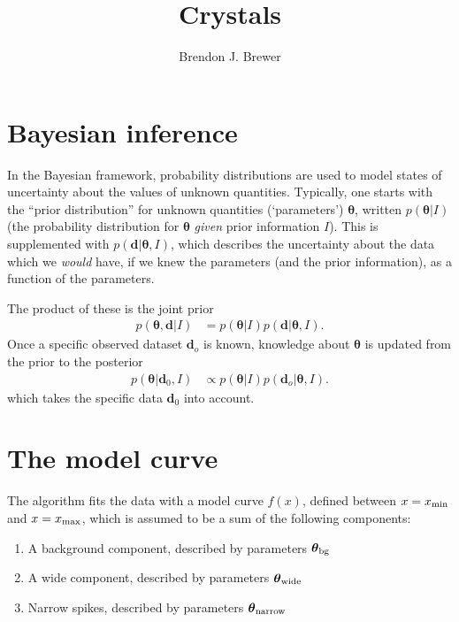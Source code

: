 \documentclass[a4paper, 12pt]{article}
\title{Crystals}
\author{Brendon J. Brewer}
\date{}
\newcommand{\params}{\boldsymbol{\theta}}
\newcommand{\data}{\boldsymbol{d}}
\newcommand{\info}{I}
\newcommand{\x}{x}
\begin{document}
\maketitle


\setlength{\parindent}{0pt}
\setlength{\parskip}{8pt}

\section{Bayesian inference}
In the Bayesian framework, probability distributions are used to model
states of uncertainty about the values of unknown quantities.
Typically, one starts with the ``prior distribution''
for unknown quantities (`parameters') $\params$, written $p(\params | \info)$
(the probability distribution for $\params$ {\em given} prior information
$\info$). This is supplemented with $p(\data | \params, \info)$,
which describes the uncertainty about the data which we {\em would} have,
if we knew the parameters (and the prior information), as a function of
the parameters.

The
product of these is the joint prior
\begin{align}
p(\params, \data | \info) &= p(\params | \info)p(\data | \params, \info).
\end{align}
Once a specific observed dataset $\data_o$ is known, knowledge about
$\params$ is updated from the prior to the posterior
\begin{align}
p(\params | \data_0, \info) &\propto
    p(\params | \info)p(\data_o | \params, \info).
\end{align}
which takes the specific data $\data_0$ into account.

\section{The model curve}
The algorithm fits the data with a model curve
$f(\x)$, defined between $\x=\x_{\rm min}$ and $\x=\x_{\rm max}$,
which is assumed to be a sum of the following components:
\begin{enumerate}
\item A background component, described by parameters $\params_{\rm bg}$
\item A wide component, described by parameters $\params_{\rm wide}$
\item Narrow spikes, described by parameters $\params_{\rm narrow}$
\end{enumerate}
\end{document}
